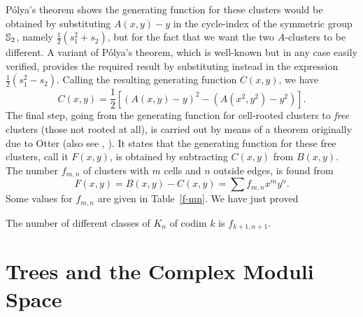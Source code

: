 \documentclass[10pt]{amsart}
\begin{document}
P\'{o}lya's theorem shows the generating function for these clusters would be obtained by substituting $A(x, y) - y$ in the cycle-index of the symmetric group $\mathbb S_2$, namely $\frac{1}{2}(s_1^2  +  s_2)$, but for the fact that we want the two $A$-clusters to be different.  A variant of P\'{o}lya's theorem, which is well-known but in any case easily verified, provides the required result by substituting instead in the expression $\frac{1}{2}(s_1^2  -  s_2)$. Calling the resulting generating function
$C(x, y)$, we have 
$$C(x, y) =\frac{1}{2}[(A(x, y)-y)^2 - (A(x^2, y^2)-y^2)].$$
The final step, going from the generating function for cell-rooted clusters to {\em free} clusters (those not rooted at all), is carried out by means of a theorem originally due to Otter \cite{ott} (also see \cite{hp}, \cite[\S4]{r1}). It states that the generating function for these free clusters, call it $F(x, y)$, is obtained by subtracting $C(x, y)$ from $B(x, y)$.  The number $f_{m,n}$ of clusters with $m$ cells and $n$ outside edges, is found from
$$F(x, y) = B(x,y) - C(x,y) = \sum f_{m,n}x^m y^n.$$
Some values for $f_{m,n}$ are given in Table~\ref{f-mn}.  We have just proved

\begin{thm} [Solution to {\em P1}\,]
The number of different classes of $K_n$ of codim $k$ is $f_{k+1,n+1}$. 
\end{thm}

%
%

\section {Trees and the Complex Moduli Space}
\end{document}
